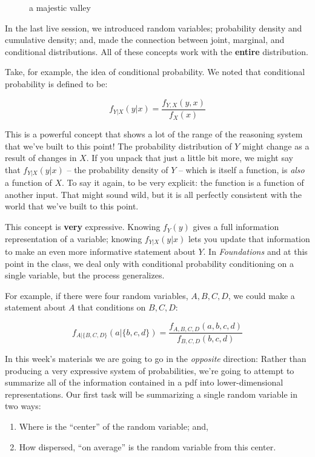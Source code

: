 \documentclass[
]{book}
\makeatletter
\newcommand*\pandocbounded[1]{%
  \sbox\pandoc@box{#1}%
  \Gscale@div\@tempa{\textheight}{\dimexpr\ht\pandoc@box+\dp\pandoc@box\relax}%
  \Gscale@div\@tempb{\linewidth}{\wd\pandoc@box}%
  \ifdim\@tempb\p@<\@tempa\p@\let\@tempa\@tempb\fi%
  \ifdim\@tempa\p@<\p@\scalebox{\@tempa}{\usebox\pandoc@box}%
  \else\usebox{\pandoc@box}%
  \fi%
}
\providecommand{\tightlist}{%
  \setlength{\itemsep}{0pt}\setlength{\parskip}{0pt}}
\theoremstyle{definition}
\theoremstyle{definition}
\theoremstyle{definition}
\theoremstyle{definition}
\theoremstyle{remark}
\makeatother
\begin{document}
\begin{figure}
\centering
\pandocbounded{\texttt{[image: ./images/yosemite.jpg]}}
\caption{a majestic valley}
\end{figure}

In the last live session, we introduced random variables; probability density and cumulative density; and, made the connection between joint, marginal, and conditional distributions. All of these concepts work with the \textbf{entire} distribution.

Take, for example, the idea of conditional probability. We noted that conditional probability is defined to be:

\[
  f_{Y|X}(y|x) = \frac{f_{Y,X}(y,x)}{f_{X}(x)}
\]

This is a powerful concept that shows a lot of the range of the reasoning system that we've built to this point! The probability distribution of \(Y\) might change as a result of changes in \(X\). If you unpack that just a little bit more, we might say that \(f_{Y|X}(y|x)\) -- the probability density of \(Y\) -- which is itself a function, is \emph{also} a function of \(X\). To say it again, to be very explicit: the function is a function of another input. That might sound wild, but it is all perfectly consistent with the world that we've built to this point.

This concept is \textbf{very} expressive. Knowing \(f_{Y}(y)\) gives a full information representation of a variable; knowing \(f_{Y|X}(y|x)\) lets you update that information to make an even more informative statement about \(Y\). In \emph{Foundations} and at this point in the class, we deal only with conditional probability conditioning on a single variable, but the process generalizes.

For example, if there were four random variables, \(A, B, C, D\), we could make a statement about \(A\) that conditions on \(B, C, D\):

\[
  f_{A|\{B,C,D\}}(a|\{b,c,d\}) = \frac{f_{A,B,C,D}(a,b,c,d)}{f_{B,C,D}(b,c,d)}
\]

In this week's materials we are going to go in the \emph{opposite} direction: Rather than producing a very expressive system of probabilities, we're going to attempt to summarize all of the information contained in a pdf into lower-dimensional representations. Our first task will be summarizing a single random variable in two ways:

\begin{enumerate}
\def\labelenumi{\arabic{enumi}.}
\tightlist
\item
  Where is the ``center'' of the random variable; and,
\item
  How dispersed, ``on average'' is the random variable from this center.
\end{enumerate}
\end{document}
